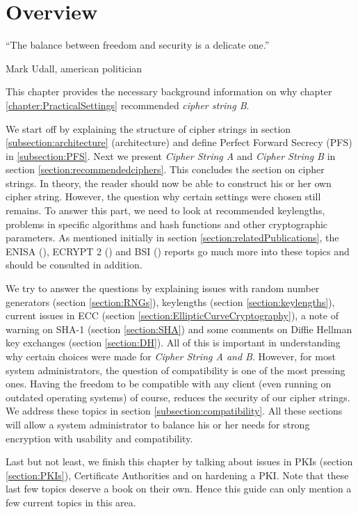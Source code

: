 \section{Overview}
\label{sec:TheoryOverview}


\epigraph{``The balance between freedom and security is a delicate one.''}{Mark Udall, american politician}

This chapter provides the necessary background information on why chapter \ref{chapter:PracticalSettings} recommended \textit{cipher string B}.

We start off by explaining the structure of cipher strings in section \ref{subsection:architecture} (architecture) and define Perfect Forward Secrecy (PFS) in \ref{subsection:PFS}. Next we present \textit{Cipher String A} and \textit{Cipher String B} in section \ref{section:recommendedciphers}. This concludes the section on cipher strings. In theory, the reader should now be able to construct his or her own cipher string. However, the question why certain settings were chosen still remains. To answer this part, we need to look at recommended keylengths, problems in specific algorithms and hash functions and other cryptographic parameters. As mentioned initially in section \ref{section:relatedPublications}, the ENISA (\cite{ENISA2013}), ECRYPT 2 (\cite{ii2011ecrypt}) and BSI (\cite{TR02102}) reports go much more into these topics and should be consulted in addition.

We try to answer the questions by explaining issues with random number generators (section \ref{section:RNGs}), keylengths (section \ref{section:keylengths}), current issues in ECC (section \ref{section:EllipticCurveCryptography}), a note of warning on SHA-1 (section \ref{section:SHA}) and some comments on Diffie Hellman key exchanges (section \ref{section:DH}). All of this is important in understanding why certain choices were made for \textit{Cipher String A and B}. However, for most system administrators, the question of compatibility is one of the most pressing ones. Having the freedom to be compatible with any client (even running on outdated operating systems) of course, reduces the security of our cipher strings. We address these topics in section \ref{subsection:compatibility}. 
All these sections will allow a system administrator to balance his or her needs for strong encryption with usability and compatibility.

Last but not least, we finish this chapter by talking about issues in PKIs (section \ref{section:PKIs}), Certificate Authorities and on hardening a PKI. Note that these last few topics deserve a book on their own. Hence this guide can only mention a few current topics in this area.

